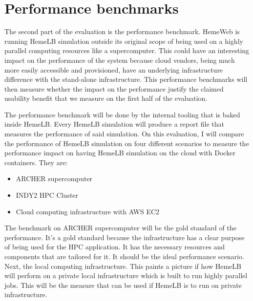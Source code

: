 
\section{Performance benchmarks}

The second part of the evaluation is the performance benchmark. HemeWeb is running HemeLB simulation outside its original scope of being used on a highly parallel computing resources like a supercomputer. This could have an interesting impact on the performance of the system because cloud vendors, being much more easily accessible and provisioned, have an underlying infrastructure difference with the stand-alone infrastructure. This performance benchmarks will then measure whether the impact on the performance justify the claimed usability benefit that we measure on the first half of the evaluation.

The performance benchmark will be done by the internal tooling that is baked inside HemeLB. Every HemeLB simulation will produce a report file that measures the performance of said simulation. On this evaluation, I will compare the performance of HemeLB simulation on four different scenarios to measure the performance impact on having HemeLB simulation on the cloud with Docker containers. They are:
\begin{itemize}
	\item{ARCHER supercomputer}
	\item{INDY2 HPC Cluster}
	\item{Cloud computing infrastructure with AWS EC2}
\end{itemize}

The benchmark on ARCHER supercomputer will be the gold standard of the performance. It's a gold standard because the infrastructure has a clear purpose of being used for the HPC application. It has the necessary resources and components that are tailored for it. It should be the ideal performance scenario. Next, the local computing infrastructure. This paints a picture if how HemeLB will perform on a private local infrastructure which is built to run highly parallel jobs. This will be the measure that can be used if HemeLB is to run on private infrastructure.

